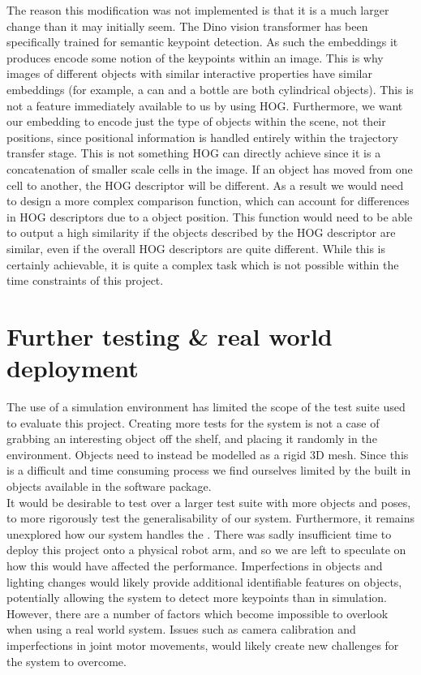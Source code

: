 The reason this modification was not implemented is that it is a much larger change than it may initially seem. The Dino vision transformer has been specifically trained for semantic keypoint detection. As such the embeddings it produces encode some notion of the keypoints within an image. This is why images of different objects with similar interactive properties have similar embeddings (for example, a can and a bottle are both cylindrical objects). This is not a feature immediately available to us by using HOG. Furthermore, we want our embedding to encode just the type of objects within the scene, not their positions, since positional information is handled entirely within the trajectory transfer stage. This is not something HOG can directly achieve since it is a concatenation of smaller scale cells in the image. If an object has moved from one cell to another, the HOG descriptor will be different. As a result we would need to design a more complex comparison function, which can account for differences in HOG descriptors due to a object position. This function would need to be able to output a high similarity if the objects described by the HOG descriptor are similar, even if the overall HOG descriptors are quite different. While this is certainly achievable, it is quite a complex task which is not possible within the time constraints of this project.

\section{Further testing \& real world deployment}
The use of a simulation environment has limited the scope of the test suite used to evaluate this project. Creating more tests for the system is not a case of grabbing an interesting object off the shelf, and placing it randomly in the environment. Objects need to instead be modelled as a rigid 3D mesh. Since this is a difficult and time consuming process we find ourselves limited by the built in objects available in the software package.\\

It would be desirable to test over a larger test suite with more objects and poses, to more rigorously test the generalisability of our system. Furthermore, it remains unexplored how our system handles the . There was sadly insufficient time to deploy this project onto a physical robot arm, and so we are left to speculate on how this would have affected the performance. Imperfections in objects and lighting changes would likely provide additional identifiable features on objects, potentially allowing the system to detect more keypoints than in simulation. However, there are a number of factors which become impossible to overlook when using a real world system. Issues such as camera calibration and imperfections in joint motor movements, would likely create new challenges for the system to overcome.